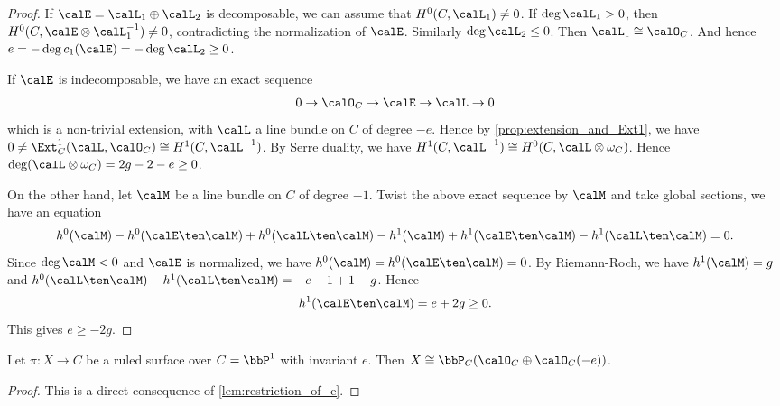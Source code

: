     \begin{proof}
        If \(\calE = \calL_1 \oplus \calL_2\) is decomposable, we can assume that \(H^0(C,\calL_1) \neq 0\).
        If \(\deg \calL_1 > 0\), then \(H^0(C,\calE \otimes \calL_1^{-1}) \neq 0\), contradicting the normalization of \(\calE\).
        Similarly \(\deg \calL_2 \leq 0\).
        Then \(\calL_1 \cong \calO_C\).
        And hence \(e = -\deg c_1(\calE) = -\deg \calL_2 \geq 0\).

        If \(\calE\) is indecomposable, we have an exact sequence
        \[ 0 \to \calO_C \to \calE \to \calL \to 0 \]
        which is a non-trivial extension, with \(\calL\) a line bundle on \(C\) of degree \(-e\).
        Hence by \cref{prop:extension_and_Ext1}, we have \(0 \neq \Ext^1_C(\calL,\calO_C) \cong H^1(C,\calL^{-1})\).
        By Serre duality, we have \(H^1(C,\calL^{-1}) \cong H^0(C,\calL \otimes \omega_C)\).
        Hence \(\deg(\calL \otimes \omega_C) = 2g - 2 - e \geq 0\).

        On the other hand, let \(\calM\) be a line bundle on \(C\) of degree \(-1\).
        Twist the above exact sequence by \(\calM\) and take global sections, we have an equation
        \[ h^0(\calM) - h^0(\calE \ten \calM) + h^0(\calL \ten \calM) - h^1(\calM) + h^1(\calE \ten \calM) - h^1(\calL \ten \calM) = 0. \]
        Since \(\deg \calM < 0\) and \(\calE\) is normalized, we have \(h^0(\calM) = h^0(\calE \ten \calM) = 0\).
        By Riemann-Roch, we have \(h^1(\calM) = g\) and \(h^0(\calL \ten \calM) - h^1(\calL \ten \calM) = -e - 1 + 1 - g\).
        Hence 
        \[ h^1(\calE \ten \calM) = e + 2g \geq 0. \]
        This gives \(e \geq -2g\).
    \end{proof}

    \begin{theorem}\label{thm:classification_of_ruled_surface_on_P1}
        Let \(\pi:X \to C\) be a ruled surface over \(C = \bbP^1\) with invariant \(e\).
        Then \(X \cong \bbP_{C}(\calO_C \oplus \calO_C(-e))\).
    \end{theorem}
    \begin{proof}
        This is a direct consequence of \cref{lem:restriction_of_e}.
    \end{proof}


